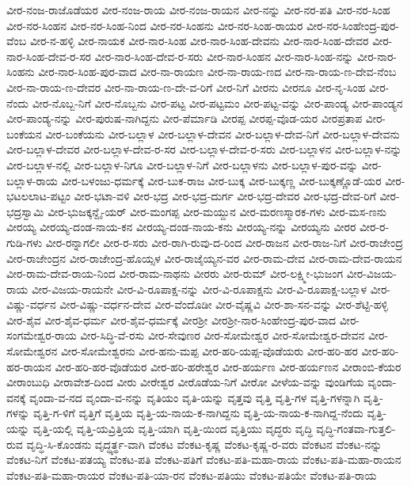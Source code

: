 {ವೀರ-ನಂಜ-ರಾಜೊಡೆಯರ
ವೀರ-ನಂಜ-ರಾಯ
ವೀರ-ನಂಜ-ರಾಯನ
ವೀರ-ನನ್ನು
ವೀರ-ನರ-ಪತಿ
ವೀರ-ನರ-ಸಿಂಹ
ವೀರ-ನರ-ಸಿಂಹನ
ವೀರ-ನರ-ಸಿಂಹ-ನಿಂದ
ವೀರ-ನರ-ಸಿಂಹನು
ವೀರ-ನರ-ಸಿಂಹ-ರಾಯರ
ವೀರ-ನರ-ಸಿಂಹೇಂದ್ರ-ಪುರ-ವೆಂಬ
ವೀರ-ನ-ಹಳ್ಳಿ
ವೀರ-ನಾಯಕ
ವೀರ-ನಾರ-ಸಿಂಹ
ವೀರ-ನಾರ-ಸಿಂಹ-ದೇವನು
ವೀರ-ನಾರ-ಸಿಂಹ-ದೇವರ
ವೀರ-ನಾರ-ಸಿಂಹ-ದೇವ-ರ-ಸರ
ವೀರ-ನಾರ-ಸಿಂಹ-ದೇವ-ರ-ಸರು
ವೀರ-ನಾರ-ಸಿಂಹನ
ವೀರ-ನಾರ-ಸಿಂಹ-ನನ್ನು
ವೀರ-ನಾರ-ಸಿಂಹನು
ವೀರ-ನಾರ-ಸಿಂಹ-ಪುರ-ವಾದ
ವೀರ-ನಾ-ರಾಯಣ
ವೀರ-ನಾ-ರಾಯ-ಣದ
ವೀರ-ನಾ-ರಾಯ-ಣ-ದೇವ-ನೆಂಬ
ವೀರ-ನಾ-ರಾಯ-ಣ-ದೇವರ
ವೀರ-ನಾ-ರಾಯ-ಣ-ದೇ-ವ-ರಿಗೆ
ವೀರ-ನಿಗೆ
ವೀರನು
ವೀರನೂ
ವೀರ-ನೃ-ಸಿಂಹ
ವೀರ-ನೆಂದು
ವೀರ-ನೊಬ್ಬ-ನಿಗೆ
ವೀರ-ನೊಬ್ಬನು
ವೀರ-ಪಟ್ಟ
ವೀರ-ಪಟ್ಟಮಂ
ವೀರ-ಪಟ್ಟ-ವನ್ನು
ವೀರ-ಪಾಂಡ್ಯ
ವೀರ-ಪಾಂಡ್ಯನ
ವೀರ-ಪಾಂಡ್ಯ-ನನ್ನು
ವೀರ-ಪುರುಷ-ನಾಗಿದ್ದನು
ವೀರ-ಪೆರ್ಮಾಡಿ
ವೀರಪ್ಪ
ವೀರಪ್ಪ-ವೊಡ-ಯರ
ವೀರಪ್ರತಾಪ
ವೀರ-ಬಂಕೆಯನ
ವೀರ-ಬಂಕೆಯನು
ವೀರ-ಬಲ್ಲಾಳ
ವೀರ-ಬಲ್ಲಾಳ-ದೇವನ
ವೀರ-ಬಲ್ಲಾಳ-ದೇವ-ನಿಗೆ
ವೀರ-ಬಲ್ಲಾಳ-ದೇವನು
ವೀರ-ಬಲ್ಲಾಳ-ದೇವರ
ವೀರ-ಬಲ್ಲಾಳ-ದೇವ-ರ-ಸರ
ವೀರ-ಬಲ್ಲಾಳ-ದೇವ-ರ-ಸರು
ವೀರ-ಬಲ್ಲಾಳನ
ವೀರ-ಬಲ್ಲಾಳ-ನನ್ನು
ವೀರ-ಬಲ್ಲಾಳ-ನಲ್ಲಿ
ವೀರ-ಬಲ್ಲಾಳ-ನಿಗೂ
ವೀರ-ಬಲ್ಲಾಳ-ನಿಗೆ
ವೀರ-ಬಲ್ಲಾಳನು
ವೀರ-ಬಲ್ಲಾಳ-ಪುರ-ವನ್ನು
ವೀರ-ಬಲ್ಲಾಳ-ರಾಯ
ವೀರ-ಬಳಂಜು-ಧರ್ಮಕ್ಕೆ
ವೀರ-ಬುಕ-ರಾಜ
ವೀರ-ಬುಕ್ಕ
ವೀರ-ಬುಕ್ಕಣ್ಣ
ವೀರ-ಬುಕ್ಕಣ್ಣೊಡೆ-ಯರ
ವೀರ-ಭಟಲಲಾಟ-ಪಟ್ಟಂ
ವೀರ-ಭಟಾ-ವಳಿ
ವೀರ-ಭದ್ರ
ವೀರ-ಭದ್ರ-ದುರ್ಗ
ವೀರ-ಭದ್ರ-ದೇವರ
ವೀರ-ಭದ್ರ-ದೇವ-ರಿಗೆ
ವೀರ-ಭದ್ರಸ್ವಾಮಿ
ವೀರ-ಭುಜಕ್ಕನ್ದೈ-ಯರ್
ವೀರ-ಮಂಗಪ್ಪ
ವೀರ-ಮಯ್ದುನ
ವೀರ-ಮರಣಸ್ಮಾರಕ-ಗಳು
ವೀರ-ಮಸ-ಣನು
ವೀರಯ್ಯ
ವೀರಯ್ಯ-ದಂಡ-ನಾಯ-ಕನ
ವೀರಯ್ಯ-ದಂಡ-ನಾಯ-ಕನು
ವೀರಯ್ಯ-ನನ್ನು
ವೀರಯ್ಯನು
ವೀರರ
ವೀರ-ರ-ಗುಡಿ-ಗಳು
ವೀರ-ರನ್ನಾಗಲೀ
ವೀರ-ರ-ಸರು
ವೀರ-ರಾಗಿ-ರುವು-ದ-ರಿಂದ
ವೀರ-ರಾಜನ
ವೀರ-ರಾಜ-ನಿಗೆ
ವೀರ-ರಾಜೇಂದ್ರ
ವೀರ-ರಾಜೇಂದ್ರನ
ವೀರ-ರಾಜೇಂದ್ರ-ಹೊಯ್ಸಳ
ವೀರ-ರಾಜೈಯ್ಯನ-ವರ
ವೀರ-ರಾಮ-ದೇವ
ವೀರ-ರಾಮ-ದೇವ-ರಾಯನ
ವೀರ-ರಾಮ-ದೇವ-ರಾಯ-ನಿಂದ
ವೀರ-ರಾಮ-ನಾಥನು
ವೀರರು
ವೀರ-ರುಮ್
ವೀರ-ಲಕ್ಷ್ಮೀ-ಭುಜಂಗ
ವೀರ-ವಿಜಯ-ರಾಯ
ವೀರ-ವಿಜಯ-ರಾಯನೇ
ವೀರ-ವಿ-ರೂಪಾಕ್ಷ-ನನ್ನು
ವೀರ-ವಿ-ರೂಪಾಕ್ಷನು
ವೀರ-ವಿ-ರೂಪಾಕ್ಷ-ಬಲ್ಲಾಳ
ವೀರ-ವಿಷ್ಣು-ವರ್ಧನ
ವೀರ-ವಿಷ್ಣು-ವರ್ಧನ-ದೇವ
ವೀರ-ವೆಂದೊಡೀ
ವೀರ-ವೈಷ್ಣವಿ
ವೀರ-ಶಾ-ಸನ-ವನ್ನು
ವೀರ-ಶೆಟ್ಟಿ-ಹಳ್ಳಿ
ವೀರ-ಶೈವ
ವೀರ-ಶೈವ-ಧರ್ಮ
ವೀರ-ಶೈವ-ಧರ್ಮಕ್ಕೆ
ವೀರಶ್ರೀ
ವೀರಶ್ರೀ-ನಾರ-ಸಿಂಹೇಂದ್ರ-ಪುರ-ವಾದ
ವೀರ-ಸಂಗಮೇಶ್ವರ-ರಾಯ
ವೀರ-ಸಿದ್ಧಿ-ವೆ-ರಸು
ವೀರ-ಸೇವುಣರ
ವೀರ-ಸೋಮೇಶ್ವರ
ವೀರ-ಸೋಮೇಶ್ವರ-ದೇವನ
ವೀರ-ಸೋಮೇಶ್ವರನ
ವೀರ-ಸೋಮೇಶ್ವರನು
ವೀರ-ಹನು-ಮಪ್ಪ
ವೀರ-ಹರಿ-ಯಪ್ಪ-ವೊಡೆಯರು
ವೀರ-ಹರಿ-ಹರ
ವೀರ-ಹರಿ-ಹರ-ರಾಯನ
ವೀರ-ಹರಿ-ಹರ-ವೊಡೆಯರ
ವೀರ-ಹರಿ-ಹರೇಶ್ವರ
ವೀರ-ಹರ್ಯಣ
ವೀರ-ಹರ್ಯಣನ
ವೀರಾಂಬಿ-ಕೆಯರ
ವೀರಾಂಬುಧಿ
ವೀರಾವೇಶ-ದಿಂದ
ವೀರು
ವೀರೇಶ್ವರ
ವೀರೊಡೆಯ-ನಿಗೆ
ವೀರೋ
ವೀಳೆಯ-ವನ್ನು
ವುಂಡಿಗೆಯ
ವೃಂದಾ-ವನಕ್ಕೆ
ವೃಂದಾ-ವ-ನದ
ವೃಂದಾ-ವ-ನನ್ನು
ವೃತಿಯಂ
ವೃತಿ-ಯನ್ನು
ವೃತ್ತವು
ವೃತ್ತಿ
ವೃತ್ತಿ-ಗಳ
ವೃತ್ತಿ-ಗಳನ್ನಾಗಿ
ವೃತ್ತಿ-ಗಳನ್ನು
ವೃತ್ತಿ-ಗ-ಳಿಗೆ
ವೃತ್ತಿಗೆ
ವೃತ್ತಿಯ
ವೃತ್ತಿ-ಯ-ನಾಯ-ಕ-ನಾಗಿದ್ದನು
ವೃತ್ತಿ-ಯ-ನಾಯ-ಕ-ನಾಗಿದ್ದ-ನೆಂದು
ವೃತ್ತಿ-ಯನ್ನು
ವೃತ್ತಿ-ಯಲ್ಲಿ
ವೃತ್ತಿ-ಯವ್ರಿತ್ತಿಯ
ವೃತ್ತಿ-ಯಾಗಿ
ವೃತ್ತಿ-ಯಿಂದ
ವೃತ್ತಿಯು
ವೃದ್ಧರು
ವೃದ್ಧಿ
ವೃದ್ಧಿ-ಗಂತವಾ-ಗುತ್ತಲಿ-ರುವ
ವೃದ್ಧಿ-ಸಿ-ಕೊಂಡನು
ವೃದ್ಧ್ಯರ್ತ್ಥ-ವಾಗಿ
ವೆಂಕಟ
ವೆಂಕಟ-ಕೃಷ್ಣ
ವೆಂಕಟ-ಕೃಷ್ಣ-ರ-ವರು
ವೆಂಕಟನ
ವೆಂಕಟ-ನನ್ನು
ವೆಂಕಟ-ನಿಗೆ
ವೆಂಕಟ-ಪತಯ್ಯ
ವೆಂಕಟ-ಪತಿ
ವೆಂಕಟ-ಪತಿಗೆ
ವೆಂಕಟ-ಪತಿ-ಮಹಾ-ರಾಯ
ವೆಂಕಟ-ಪತಿ-ಮಹಾ-ರಾಯನ
ವೆಂಕಟ-ಪತಿ-ಮಹಾ-ರಾಯರ
ವೆಂಕಟ-ಪತಿ-ಯಾ-ರನ
ವೆಂಕಟ-ಪತಿಯು
ವೆಂಕಟ-ಪತಿಯೇ
ವೆಂಕಟ-ಪತಿ-ರಾಯ
}
